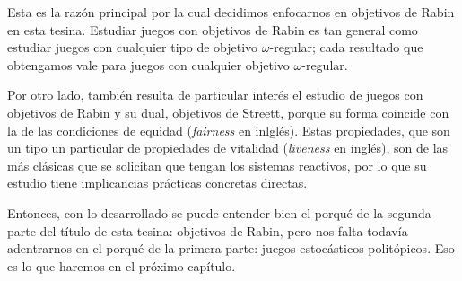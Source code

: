 Esta es la razón principal por la cual decidimos enfocarnos en objetivos de
Rabin en esta tesina. Estudiar juegos con objetivos de Rabin es tan general
como estudiar juegos con cualquier tipo de objetivo $\omega$-regular; cada
resultado que obtengamos vale para juegos con cualquier objetivo
$\omega$-regular.

Por otro lado, también resulta de particular interés el estudio de juegos con
objetivos de Rabin y su dual, objetivos de Streett, porque su forma coincide
con la de las condiciones de equidad (\textit{fairness} en inlglés). Estas
propiedades, que son un tipo un particular de propiedades de vitalidad
(\textit{liveness} en inglés), son de las más clásicas que se solicitan que
tengan los sistemas reactivos, por lo que su estudio tiene implicancias
prácticas concretas directas.


Entonces, con lo desarrollado se puede entender bien el porqué de la segunda
parte del título de esta tesina: objetivos de Rabin, pero nos falta todavía
adentrarnos en el porqué de la primera parte: juegos estocásticos politópicos.
Eso es lo que haremos en el próximo capítulo.

